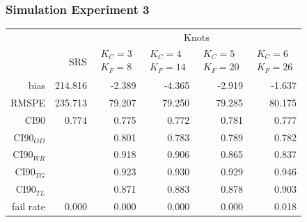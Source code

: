 \documentclass[mathserif,compress]{beamer}\usepackage{graphicx, color}
\begin{document}
\begin{frame}[fragile]
\frametitle{Simulation Experiment 3}

\footnotesize
\begin{table}[ht]
\centering
\begin{tabular}{rrrrrr}
  \hline
  \hline
	&  & \multicolumn{4}{c}{Knots} \\ 
 & SRS & $\begin{array}{c}K_C=3  \\ K_F=8 \end{array}$ & $\begin{array}{c}K_C=4  \\ K_F=14 \end{array}$ & $\begin{array}{c}K_C=5  \\ K_F=20 \end{array}$ & $\begin{array}{c}K_C=6  \\ K_F=26 \end{array}$ \\
  \hline
bias & 214.816 & -2.389 & -4.365 & -2.919 & -1.637 \\ 
  RMSPE & 235.713 & 79.207 & 79.250 & 79.285 & 80.175 \\ 
  CI90 & 0.774 & 0.775 & 0.772 & 0.781 & 0.777 \\ 
  CI90$_{OD}$ &  & 0.801 & 0.783 & 0.789 & 0.782 \\ 
  CI90$_{WR}$ &  & 0.918 & 0.906 & 0.865 & 0.837 \\ 
  CI90$_{TG}$ &  & 0.923 & 0.930 & 0.929 & 0.946 \\ 
  CI90$_{TL}$ &  & 0.871 & 0.883 & 0.878 & 0.903 \\ 
  fail rate & 0.000 & 0.000 & 0.000 & 0.000 & 0.018 \\ 
   \hline
\end{tabular}
\end{table}

\end{frame}

\end{document}
